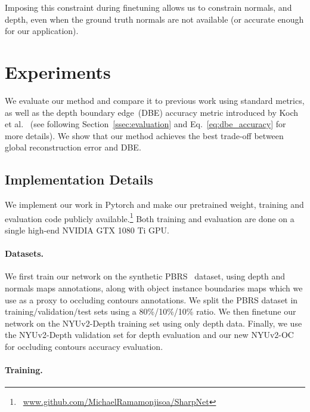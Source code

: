\documentclass[10pt,twocolumn,letterpaper]{article}
\begin{document}
Imposing this constraint during finetuning allows us to
constrain normals, and depth, even when the ground truth
normals  are not available (or accurate enough for our application).
 
\section{Experiments}



We evaluate our  method and compare it to previous  work using standard metrics,
as well as the depth boundary  edge~(DBE) accuracy  metric introduced by  Koch 
et al.~\cite{Koch2018EvaluationOC}  (see  following  
Section~\ref{ssec:evaluation} and Eq.~\eqref{eq:dbe_accuracy} for more 
details).  We show that our method
achieves the best trade-off  between global reconstruction error and DBE.

\subsection{Implementation Details}\label{ssec:implementation}

We implement our work in Pytorch and make our pretrained weight, training and 
evaluation code publicly 
available.\footnote{~\url{www.github.com/MichaelRamamonjisoa/SharpNet}} 
Both training and evaluation are done on a single high-end NVIDIA GTX 1080 Ti 
GPU.

\paragraph{Datasets.}
We first train our network on the synthetic PBRS~\cite{Zhang2016pbrs} dataset, 
using depth and normals maps annotations, along with object instance boundaries 
maps which we use as a proxy to occluding contours annotations. We split the 
PBRS dataset in \mbox{training/validation/test} sets using a 80\%/10\%/10\% 
ratio. We then finetune our network on the NYUv2-Depth training set using only 
depth data. Finally, we use the NYUv2-Depth validation set for depth evaluation 
and our new NYUv2-OC for occluding contours accuracy evaluation.

\paragraph{Training.} 
\end{document}
